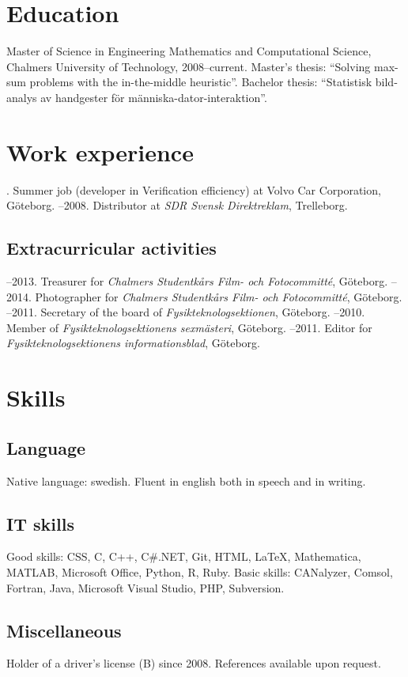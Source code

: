 \documentclass{skvitae}
\author{Simon Sigurdhsson}
\affiliation{}
\begin{document}
	\RaggedRight
	\maketitle

	\section{Education}
	\ind Master of Science in Engineering Mathematics and Computational Science, Chalmers University of Technology, 2008--current. %
		 Master's thesis: \enquote{Solving max-sum problems with the in-the-middle heuristic}. %
		 Bachelor thesis: \foreignquote{swedish}{Statistisk bildanalys av handgester för människa-dator-interaktion}.

	\section{Work experience}
	. Summer job (developer in Verification efficiency) at Volvo Car Corporation, Göteborg.
	--2008. Distributor at \emph{SDR Svensk Direktreklam}, Trelleborg.

	\medskip
	\subsection{Extracurricular activities}
	--2013. Treasurer for \emph{Chalmers Studentkårs Film- och Fotocommitté}, Göteborg.
	--2014. Photographer for \emph{Chalmers Studentkårs Film- och Fotocommitté}, Göteborg.
	--2011. Secretary of the board of \emph{Fysikteknologsektionen}, Göteborg.
	--2010. Member of \emph{Fysikteknologsektionens sexmästeri}, Göteborg.
	--2011. Editor for \emph{Fysikteknologsektionens informationsblad}, Göteborg.

	\section{Skills}
	\subsection{Language}
	\ind Native language: swedish. Fluent in english both in speech and in writing.

	\medskip
	\subsection{IT skills}
	\ind Good skills: CSS, C, C++, C\#.NET, Git, HTML, \LaTeX, Mathematica, MATLAB, Microsoft Office, Python, R, Ruby.
	\ind Basic skills: CANalyzer, Comsol, Fortran, Java, Microsoft Visual Studio, PHP, Subversion.

	\medskip
	\subsection{Miscellaneous}
	\ind Holder of a driver's license (B) since 2008.
	\ind References available upon request.
\end{document}
